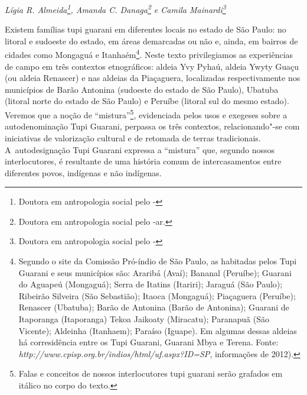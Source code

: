 
\begin{flushright}
\emph{Lígia R. Almeida\footnote{Doutora em antropologia social pelo
-}, Amanda C. Danaga\footnote{Doutora em antropologia
social pelo -ar.} e Camila Mainardi\footnote{Doutora em antropologia social pelo -}}
\end{flushright}
\medskip
%

\noindent
Existem famílias tupi guarani em diferentes locais no estado de São
Paulo: no litoral e sudoeste do estado, em áreas demarcadas ou não e,
ainda, em bairros de cidades como Mongaguá e Itanhaém\footnote{Segundo
o site da Comissão Pró-índio de São Paulo, as  habitadas pelos Tupi
Guarani e seus municípios são: Araribá (Avaí); Bananal (Peruíbe);
Guarani do Aguapeú (Mongaguá); Serra de Itatins (Itariri); Jaraguá (São
Paulo); Ribeirão Silveira (São Sebastião); Itaoca (Mongaguá);
Piaçaguera (Peruíbe); Renascer (Ubatuba); Barão de Antonina (Barão de
Antonina); Guarani de Itaporanga (Itaporanga) Tekoa Jaikoaty
(Miracatu); Paranapuã (São Vicente); Aldeinha (Itanhaem); Paraíso
(Iguape). Em algumas dessas aldeias há corresidência entre os Tupi
Guarani, Guarani Mbya e Terena. Fonte: \emph{http://www.cpisp.org.br/indios/html/uf.aspx?ID=SP}, informações de
2012).}. Neste texto privilegiamos as experiências de campo em três
contextos etnográficos: aldeia Yvy Pyhaú, aldeia Ywyty Guaçu (ou aldeia
Renascer) e nas aldeias da  Piaçaguera, localizadas respectivamente
nos municípios de Barão Antonina (sudoeste do estado de São Paulo),
Ubatuba (litoral norte do estado de São Paulo) e Peruíbe (litoral sul
do mesmo estado). Veremos que a noção de ``mistura''\footnote{Falas e
conceitos de nossos interlocutores tupi guarani serão grafados em
itálico no corpo do texto.}, evidenciada pelos usos e exegeses sobre a
autodenominação Tupi Guarani, perpassa os três contextos,
relacionando"-se com iniciativas de valorização cultural e de retomada
de terras tradicionais. A~autodesignação Tupi Guarani expressa a
``mistura'' que, segundo nossos interlocutores, é resultante de uma história
comum de intercasamentos entre diferentes povos, indígenas e não
indígenas. 

